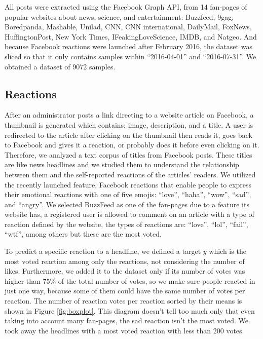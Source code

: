 \documentclass[9pt]{article}
\begin{document}
All posts were extracted using the Facebook Graph API, from 14 fan-pages of popular websites about news, science, and entertainment: Buzzfeed, 9gag, Boredpanda, Mashable, Unilad, CNN, CNN international, DailyMail, FoxNews, HuffingtonPost, New York Times, IFeakingLoveScience, IMDB, and Natgeo. And because Facebook reactions were launched after February 2016, the dataset was sliced so that it only contains samples within ``2016-04-01'' and ``2016-07-31''. We obtained a dataset of 9072 samples.

\subsection{Reactions}

After an administrator posts a link directing to a website article on Facebook, a thumbnail is generated which contains: image, description, and a title. A user is redirected to the article after clicking on the thumbnail then reads it, goes back to Facebook and gives it a reaction, or probably does it before even clicking on it. Therefore, we analyzed a text corpus of titles from Facebook posts. These titles are like news headlines and we studied them to understand the relationship between them and the self-reported reactions of the articles' readers. We utilized the recently launched feature, Facebook reactions that enable people to express their emotional reactions with one of five emojis: ``love'', ``haha'', ``wow'', ``sad'', and ``angry''. We selected BuzzFeed as one of the fan-pages due to a feature its website has, a registered user is allowed to comment on an article with a type of reaction defined by the website, the types of reactions are: ``love'', ``lol'', ``fail'', ``wtf'', among others but these are the most voted.

To predict a specific reaction to a headline, we defined a target $y$ which is the most voted reaction among only the reactions, not considering the number of likes. Furthermore, we added it to the dataset only if its number of votes was higher than 75\% of the total number of votes, so we make sure people reacted in just one way, because some of them could have the same number of votes per reaction. The number of reaction votes per reaction sorted by their means is shown in Figure \ref{fig:boxplot}. This diagram doesn't tell too much only that even taking into account many fan-pages, the sad reaction isn't the most voted. We took away the headlines with a most voted reaction with less than $200$ votes.
\end{document}
